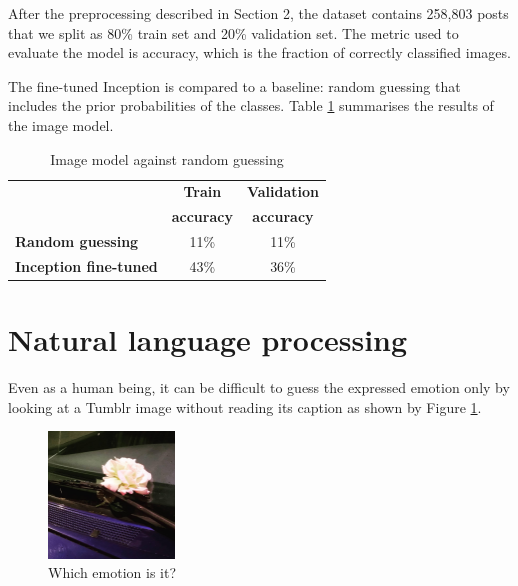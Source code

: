\documentclass{article} %
\begin{document}
After the preprocessing described in Section 2, the dataset contains 258,803 posts that we split as 80\% train set and 20\% validation set. The metric used to evaluate the model is accuracy, which is the fraction of correctly classified images.

The fine-tuned Inception is compared to a baseline: random guessing that includes the prior probabilities of the classes. Table \ref{image-results} summarises the results of the image model.

\begin{table}[H]
\caption{Image model against random guessing}
\begin{center}
    \begin{tabular}{ l | c | c}
    & \textbf{Train} & \textbf{Validation} \\
    & \textbf{accuracy} & \textbf{accuracy} \\ \hline
    \textbf{Random guessing} & 11\% & 11\% \\ \hline
    \textbf{Inception fine-tuned}  & 43\% & 36\% \\
    \end{tabular}
\end{center}
\label{image-results}
\end{table}

\section{Natural language processing}
Even as a human being, it can be difficult to guess the expressed emotion only by looking at a Tumblr image without reading its caption as shown by Figure \ref{surprised-unclear}.

\begin{figure}[H]
    \centering
    \includegraphics[width=0.3\textwidth]{Images/flower.jpg}
    \caption{Which emotion is it?}
    \label{surprised-unclear}
\end{figure}
\end{document}
